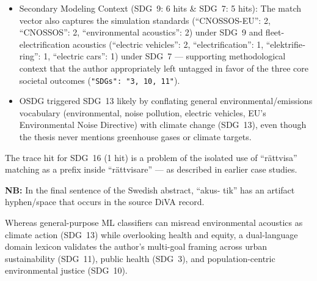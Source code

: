 \begin{casestudySection}
\begin{itemize}
    \item Secondary Modeling Context (\gls{SDG}~9: \num{6} hits \& \gls{SDG}~7: \num{5} hits): The match vector also captures the simulation standards (\enquote{CNOSSOS-EU}: 2, \enquote{CNOSSOS}: 2, \enquote{environmental acoustics}: 2) under \gls{SDG}~9 and fleet-electrification acoustics (\enquote{electric vehicles}: 2, \enquote{electrification}: 1, \enquote{\foreignlanguage{swedish}{elektrifiering}}: 1, \enquote{electric cars}: 1) under \gls{SDG}~7 --- supporting methodological context that the author appropriately left untagged in favor of the three core societal outcomes (\texttt{"SDGs": "3, 10, 11"}).

    \item OSDG triggered \gls{SDG}~13 likely by conflating general environmental/emissions vocabulary (environmental, noise pollution, electric vehicles, \gls{EU}'s Environmental Noise Directive) with climate change (\gls{SDG}~13), even though the thesis never mentions greenhouse gases or climate targets.
\end{itemize}

The trace hit for \gls{SDG}~16 (\num{1} hit) is a problem of the isolated use of \enquote{\foreignlanguage{swedish}{rättvisa}} matching as a prefix inside \enquote{\foreignlanguage{swedish}{rättvisare}} --- as described in earlier case studies.

\textbf{NB:} In the final sentence of the Swedish abstract, \enquote{\foreignlanguage{swedish}{akus- tik}} has an artifact hyphen/space that occurs in the source \gls{DiVA} record.
\end{casestudySection}

\begin{takeaway}
Whereas general-purpose \gls{ML} classifiers can misread environmental acoustics as climate action (\gls{SDG}~13) while overlooking health and equity, a dual-language domain lexicon validates the author's multi-goal framing across urban sustainability (\gls{SDG}~11), public health (\gls{SDG}~3), and population-centric environmental justice (\gls{SDG}~10).
\end{takeaway}


